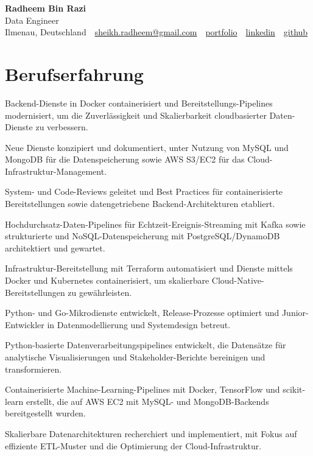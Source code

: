\documentclass[11pt,a4paper]{resume}
\makeatletter
\newcommand{\Portfolio}{https://radheem.github.io/my-cv}
\newcommand{\PortfolioText}{portfolio}
\newcommand{\GitHub}{https://github.com/radheem}
\newcommand{\LinkedIn}{https://www.linkedin.com/in/radheem-razi}
\newcommand{\Email}{sheikh.radheem@gmail.com}
\makeatother
\begin{document}
\clearpage
{}

\begin{center}
  {\huge\bfseries Radheem Bin Razi}\\[3pt]
  {\large Data Engineer}\\[6pt]
  \small
  Ilmenau, Deutschland \,\textbar\,
  \href{mailto:\Email}{\Email} \,\textbar\,
  \href{\Portfolio}{\PortfolioText} \,\textbar\,
  \href{\LinkedIn}{linkedin} \,\textbar\,
  \href{\GitHub}{github}
\end{center}
\vspace{2pt}

\section{Berufserfahrung}

\bullets
  \item Backend-Dienste in Docker containerisiert und Bereitstellungs-Pipelines modernisiert, um die Zuverlässigkeit und Skalierbarkeit cloudbasierter Daten-Dienste zu verbessern.
  \item Neue Dienste konzipiert und dokumentiert, unter Nutzung von MySQL und MongoDB für die Datenspeicherung sowie AWS S3/EC2 für das Cloud-Infrastruktur-Management.
  \item System- und Code-Reviews geleitet und Best Practices für containerisierte Bereitstellungen sowie datengetriebene Backend-Architekturen etabliert.
\bulletsend
\vspace{3pt}
\bullets
  \item Hochdurchsatz-Daten-Pipelines für Echtzeit-Ereignis-Streaming mit Kafka sowie strukturierte und NoSQL-Datenspeicherung mit PostgreSQL/DynamoDB architektiert und gewartet.
  \item Infrastruktur-Bereitstellung mit Terraform automatisiert und Dienste mittels Docker und Kubernetes containerisiert, um skalierbare Cloud-Native-Bereitstellungen zu gewährleisten.
  \item Python- und Go-Mikrodienste entwickelt, Release-Prozesse optimiert und Junior-Entwickler in Datenmodellierung und Systemdesign betreut.
\bulletsend
\vspace{3pt}
\bullets
  \item Python-basierte Datenverarbeitungspipelines entwickelt, die Datensätze für analytische Visualisierungen und Stakeholder-Berichte bereinigen und transformieren.
  \item Containerisierte Machine-Learning-Pipelines mit Docker, TensorFlow und scikit-learn erstellt, die auf AWS EC2 mit MySQL- und MongoDB-Backends bereitgestellt wurden.
  \item Skalierbare Datenarchitekturen recherchiert und implementiert, mit Fokus auf effiziente ETL-Muster und die Optimierung der Cloud-Infrastruktur.
\bulletsend
\vspace{3pt}
\end{document}
